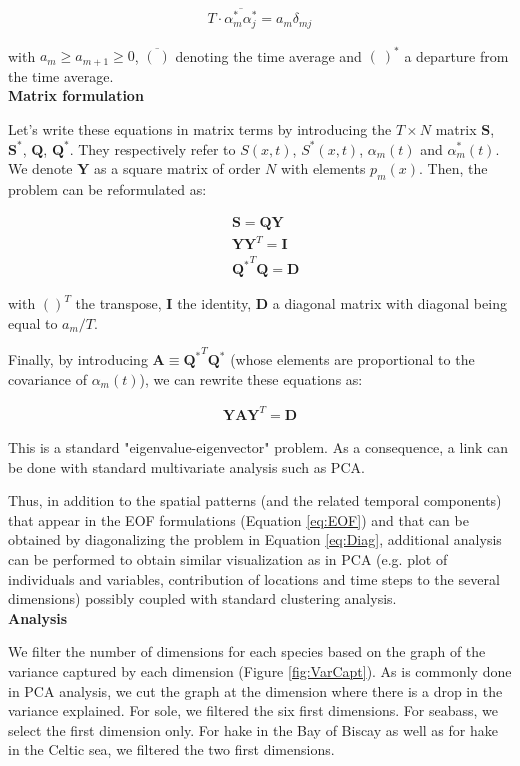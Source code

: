 \begin{align}
\label{eq:Orthog2}
T \cdot \overline{\alpha_m^* \alpha_j^*} = a_m \delta_{mj}
\end{align}

with $a_m	\geq a_{m+1} \geq 0$, $\overline{( \ )}$ denoting the time average and $( \ )^*$ a departure from the time average. \\


\textbf{Matrix formulation}

Let's write these equations in matrix terms by introducing the $T \times N$ matrix $\mathbf{S}$, $\mathbf{S}^*$, $\mathbf{Q}$, $\mathbf{Q}^*$. They respectively refer to $S(x,t)$, $S^*(x,t)$, $\alpha_m(t)$ and $\alpha_m^*(t)$. We denote $\mathbf{Y}$ as a square matrix of order $N$ with elements $p_{m}(x)$. Then, the problem can be reformulated as:

\begin{align}
& \mathbf{S}=\mathbf{QY} \\
& \mathbf{YY}^T=\mathbf{I} \\
& {\mathbf{Q}^{*}}^T\mathbf{Q} = \mathbf{D}
\end{align}

with $()^T$ the transpose, $\mathbf{I}$ the identity, $\mathbf{D}$ a diagonal matrix with diagonal being equal to $a_m / T$.

Finally, by introducing $\mathbf{A} \equiv {\mathbf{Q}^*}^T \mathbf{Q}^*$ (whose elements are proportional to the covariance of $\alpha_m(t)$), we can rewrite these equations as:

\begin{align}
\label{eq:Diag}
\mathbf{YAY}^T=\mathbf{D}
\end{align}

This is a standard "eigenvalue-eigenvector" problem. As a consequence, a link can be done with standard multivariate analysis such as PCA. 

Thus, in addition to the spatial patterns (and the related temporal components) that appear in the EOF formulations (Equation \ref{eq:EOF}) and that can be obtained by diagonalizing the problem in Equation \ref{eq:Diag}, additional analysis can be performed to obtain similar visualization as in PCA (e.g. plot of individuals and variables, contribution of locations and time steps to the several dimensions) possibly coupled with standard clustering analysis. \\


\textbf{Analysis}

We filter the number of dimensions for each species based on the graph of the variance captured by each dimension (Figure \ref{fig:VarCapt}). As is commonly done in PCA analysis, we cut the graph at the dimension where there is a drop in the variance explained. For sole, we filtered the six first dimensions. For seabass, we select the first dimension only. For hake in the Bay of Biscay as well as for hake in the Celtic sea, we filtered the two first dimensions.

